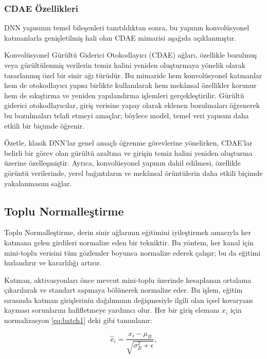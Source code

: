 
\subsubsection{CDAE Özellikleri}

DNN yapısının temel bileşenleri tanıtıldıktan sonra, bu yapının konvolüsyonel katmanlarla genişletilmiş hali olan CDAE mimarisi aşağıda açıklanmıştır.

Konvolüsyonel Gürültü Giderici Otokodlayıcı (CDAE) ağları, özellikle bozulmuş veya gürültülenmiş verilerin temiz halini yeniden oluşturmaya yönelik olarak tasarlanmış özel bir sinir ağı türüdür. Bu mimaride hem konvolüsyonel katmanlar hem de otokodlayıcı yapısı birlikte kullanılarak hem mekânsal özellikler korunur hem de sıkıştırma ve yeniden yapılandırma işlemleri gerçekleştirilir. Gürültü giderici otokodlayıcılar, giriş verisine yapay olarak eklenen bozulmaları öğrenerek bu bozulmaları telafi etmeyi amaçlar; böylece model, temel veri yapısını daha etkili bir biçimde öğrenir.

Özetle, klasik DNN'lar genel amaçlı öğrenme görevlerine yönelirken, CDAE'lar belirli bir görev olan gürültü azaltma ve girişin temiz halini yeniden oluşturma üzerine özelleşmiştir. Ayrıca, konvolüsyonel yapının dahil edilmesi, özellikle görüntü verilerinde, yerel bağıntıların ve mekânsal örüntülerin daha etkili biçimde yakalanmasını sağlar.


\subsection{Toplu Normalleştirme}

Toplu Normalleştirme, derin sinir ağlarının eğitimini iyileştirmek amacıyla her katmana gelen girdileri normalize eden bir tekniktir. Bu yöntem, her kanal için mini-toplu verisini tüm gözlemler boyunca normalize ederek çalışır; bu da eğitimi hızlandırır ve kararlılığı artırır.

Katman, aktivasyonları önce mevcut mini-toplu üzerinde hesaplanan ortalama çıkarılarak ve standart sapmaya bölünerek normalize eder. Bu işlem, eğitim sırasında katman girişlerinin dağılımının değişmesiyle ilgili olan içsel kovaryans kayması sorunlarını hafifletmeye yardımcı olur. Her bir giriş elemanı \( x_i \) için normalizasyon \eqref{eq:batch1} deki gibi tanımlanır:

\begin{equation}
    \widehat{x}_i = \frac{x_i - \mu_B}{\sqrt{\sigma_B^2 + \epsilon}},
    \label{eq:batch1}
\end{equation}

